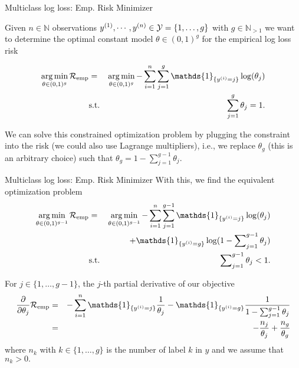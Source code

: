 \documentclass[11pt,compress,t,notes=noshow, xcolor=table]{beamer}
\newcommand{\argminl}{\mathop{\operatorname{arg\,min}}\limits}
\begin{document}
\begin{frame}{Multiclass log loss: Emp. Risk Minimizer}

Given $n \in \mathbb{N}$ observations $y^{(1)}, \cdots, y^{(n)} \in \mathcal{Y} = \{1, \dots, g\}$ with $g\in\mathbb{N}_{>1}$ we want to determine the optimal constant model $\theta \in (0,1)^g$ for the empirical log loss risk

\begin{eqnarray*}
  \argminl_{\theta \in (0, 1)^g}\riske   &=& 
  \argminl_{\theta \in (0, 1)^g}-\sum^n_{i=1}\sum^g_{j=1} \mathds{1}_{\{y^{(i)} = j\}}\log(\theta_j) \\
  &\text{s.t.}& \sum^g_{j=1}\theta_j = 1.
\end{eqnarray*}

We can solve this constrained optimization problem by plugging the constraint into the risk (we could also use Lagrange multipliers), i.e., we replace $\theta_g$ (this is an arbitrary choice) such that $
 \theta_g = 1 - \sum^{g-1}_{j=1}\theta_j.$

\end{frame}
\begin{frame}{Multiclass log loss: Emp. Risk Minimizer}
With this, we find the equivalent optimization problem
\begin{eqnarray*}
  \argminl_{\theta \in (0, 1)^{g-1}}\riske  & = & \argminl_{\theta \in (0, 1)^{g-1}}
  -\sum^n_{i=1}\sum^{g-1}_{j=1} \mathds{1}_{\{y^{(i)} = j\}}\log(\theta_j) \\ 
  &&+ \mathds{1}_{\{y^{(i)} = g\}}\log(1 - \sum\nolimits^{g-1}_{j=1}\theta_j) \\
  &\text{s.t.}&  \sum\nolimits^{g-1}_{j=1}\theta_j < 1.
\end{eqnarray*}

For $j \in \{1,\dots,g-1\}$, the $j$-th partial derivative of our objective 
\begin{eqnarray*}
 \frac{\partial}{\partial \theta_j}\riske  & = & 
  -\sum^n_{i=1} \mathds{1}_{\{y^{(i)} = j\}}\frac{1}{\theta_j} - \mathds{1}_{\{y^{(i)} = g\}}\frac{1}{1 - \sum^{g-1}_{j=1}\theta_j} \\
  & = & -\frac{n_j}{\theta_j} + \frac{n_g}{\theta_g}
\end{eqnarray*}
where $n_k$ with $k\in \{1,\dots, g\}$ is the number of label $k$ in $y$ and we assume that $n_k > 0.$

\end{frame}
\end{document}
